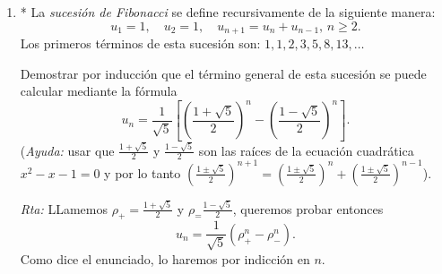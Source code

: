 \documentclass[a4paper,12pt,twoside,spanish,reqno]{amsbook}
\numberwithin{equation}{section}
\newcommand{\rta}{\noindent\textit{Rta: }}
\begin{document}
\begin{enumerate}
\begin{enumerate}
            
            
            \item Sea $a\in\mathbb R$, con $a\neq 0$. Vamos a demostrar que para todo entero no negativo $n$, $a^n=1$.
            
            Como $a^0=1$ por definición, la proposición es verdadera para $n=0$. Supongamos
            que para  un entero $k$, $a^m=1$ para $0\leq m \leq k$. Entonces
            $a^{k+1}= \frac{a^k a^k}{a^{k-1}}=\frac{1\cdot1}1=1$.
            Por lo tanto, el principio de inducción fuerte implica que $a^n=1$ para todo $n\in \mathbb N$.
            
            \rta En  este caso falla el paso inductivo para $k=0$,  en este caso el razonamiento es
            \begin{equation*}
                a^{1}= \frac{a^0 a^0}{a^{-1}}=\frac{1\cdot1}1=1
            \end{equation*}
            Pero la última igualdad es incorrecta, pues nada demuestra que $a^{-1}$  se igual a $1$ y, en efecto, no lo es salvo que  $a=1$. 
        \end{enumerate}
        
         \item * La \emph{sucesión de Fibonacci} se define recursivamente de la siguiente manera:
        $$
        u_1=1,\quad u_2=1,\quad u_{n+1}=u_{n}+u_{n-1}, \, n\geq 2.
        $$
        Los primeros términos de esta sucesión son: $1,1,2,3,5,8,13,\ldots$
        
        Demostrar por inducción que el término general de esta sucesión se puede calcular mediante la fórmula
        $$
        u_n= \frac{1}{\sqrt{5}}\left[\left(\frac{1+\sqrt{5}}{2}\right)^n-\left(\frac{1-\sqrt{5}}{2}\right)^n\right].
        $$
        (\textit{Ayuda:} usar que $\frac{1+\sqrt{5}}{2}$ y $\frac{1-\sqrt{5}}{2}$ son las raíces de la ecuación cuadrática $x^2-x-1=0$ y por lo tanto  $\left(\frac{1\pm\sqrt{5}}{2}\right)^{n+1} = \left(\frac{1\pm\sqrt{5}}{2}\right)^{n}+\left(\frac{1\pm\sqrt{5}}{2}\right)^{n-1}$).
        
        \rta LLamemos $\rho_+ = \frac{1+\sqrt{5}}{2}$ y $\rho_ = \frac{1-\sqrt{5}}{2}$,  queremos probar entonces
        \begin{equation}
            u_n= \frac{1}{\sqrt{5}}(\rho_+^n - \rho_-^n). \tag{$P_n$}
        \end{equation}
        Como dice el enunciado, lo haremos por indicción en $n$.
        

\end{enumerate}
\end{document}
